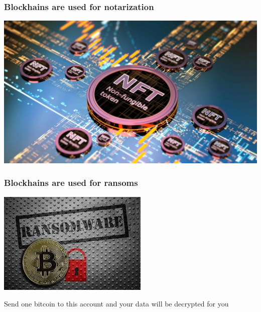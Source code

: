 \documentclass[11pt]{beamer}  %
\begin{document}
\begin{frame}\frametitle{Blockhains are used for notarization}

  \begin{center}
    \includegraphics[scale=0.258,clip=false]{pictures/nft.jpg}
  \end{center}

\end{frame}

\begin{frame}\frametitle{Blockhains are used for ransoms}

  \begin{center}
    \includegraphics[scale=0.7, clip=false]{pictures/ransom.jpg}
  \end{center}

  \begin{redbox}{}
    Send one bitcoin to this account and your data will be decrypted for you
  \end{redbox}

\end{frame}
\end{document}
